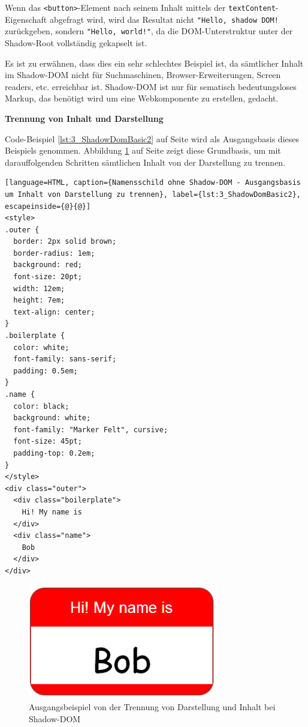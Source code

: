 Wenn das \lstinline|<button>|-Element nach seinem Inhalt mittels der \lstinline|textContent|-Eigenschaft abgefragt wird, wird das Resultat nicht \lstinline|"Hello, shadow DOM!| zurückgeben, sondern \lstinline|"Hello, world!"|, da die DOM-Unterstruktur unter der Shadow-Root vollständig gekapselt ist.

Es ist zu erwähnen, dass dies ein sehr schlechtes Beispiel ist, da sämtlicher Inhalt im Shadow-DOM nicht für Suchmaschinen, Browser-Erweiterungen, Screen readers, etc. erreichbar ist. Shadow-DOM ist nur für sematisch bedeutungsloses Markup, das benötigt wird um eine Webkomponente zu erstellen, gedacht.

\textbf{Trennung von Inhalt und Darstellung}

Code-Beispiel \ref{lst:3_ShadowDomBasic2} auf Seite \pageref{lst:3_ShadowDomBasic2} wird als Ausgangsbasis dieses Beispiels genommen. Abbildung \ref{fig:3_ShadowDom2} auf Seite \pageref{fig:3_ShadowDom2} zeigt diese Grundbasis, um mit darauffolgenden Schritten sämtlichen Inhalt von der Darstellung zu trennen.

\begin{lstlisting}[language=HTML, caption={Namensschild ohne Shadow-DOM - Ausgangsbasis um Inhalt von Darstellung zu trennen}, label={lst:3_ShadowDomBasic2}, escapeinside={@}{@}]
<style>
.outer {
  border: 2px solid brown;
  border-radius: 1em;
  background: red;
  font-size: 20pt;
  width: 12em;
  height: 7em;
  text-align: center;
}
.boilerplate {
  color: white;
  font-family: sans-serif;
  padding: 0.5em;
}
.name {
  color: black;
  background: white;
  font-family: "Marker Felt", cursive;
  font-size: 45pt;
  padding-top: 0.2em;
}
</style>
<div class="outer">
  <div class="boilerplate">
    Hi! My name is
  </div>
  <div class="name">
    Bob
  </div>
</div>
\end{lstlisting}

\begin{figure}[h]
\centering
\includegraphics[height=5.0cm]{images/SS3.png}
\caption[
  Ausgangsbeispiel von der Trennung von Darstellung und Inhalt bei Shadow-DOM \citereset \autocite{Cooney.2013}
]{Ausgangsbeispiel von der Trennung von Darstellung und Inhalt bei Shadow-DOM}
\label{fig:3_ShadowDom2}
\end{figure}

